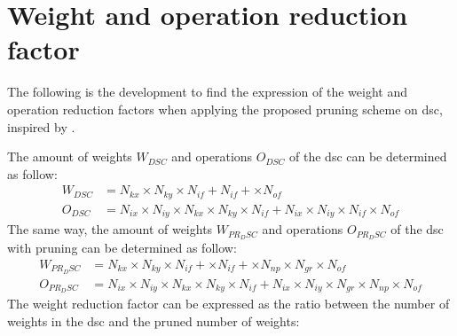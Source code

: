 \chapter{Weight and operation reduction factor} \label{appendix:factor}
The following is the development to find the expression of the weight and operation reduction factors when applying the proposed pruning scheme on \acrshort{dsc}, inspired by \textcite{bai_cnn_2018, liu_fpga-based_2019}.

The amount of weights $W_{DSC}$ and operations $O_{DSC}$ of the \acrshort{dsc} can be determined as follow:
%
\begin{align*}
    W_{DSC} &= N_{kx} \times N_{ky} \times N_{if} + N_{if} + \times N_{of} \\
    O_{DSC} &= N_{ix} \times N_{iy} \times N_{kx} \times N_{ky} \times N_{if} + N_{ix} \times N_{iy} \times N_{if} \times N_{of}
\end{align*}
%
The same way, the amount of weights $W_{PR_DSC}$ and operations $O_{PR_DSC}$ of the \acrshort{dsc} with pruning can be determined as follow:
%
\begin{align*}
    W_{PR_DSC} &= N_{kx} \times N_{ky} \times N_{if} + \times N_{if} + \times N_{np} \times N_{gr} \times N_{of}\\
    O_{PR_DSC} &= N_{ix} \times N_{iy} \times N_{kx} \times N_{ky} \times N_{if} + N_{ix} \times N_{iy} \times N_{gr} \times N_{np} \times N_{of} 
\end{align*}
%
The weight reduction factor can be expressed as the ratio between the number of weights in the \acrshort{dsc} and the pruned number of weights:


